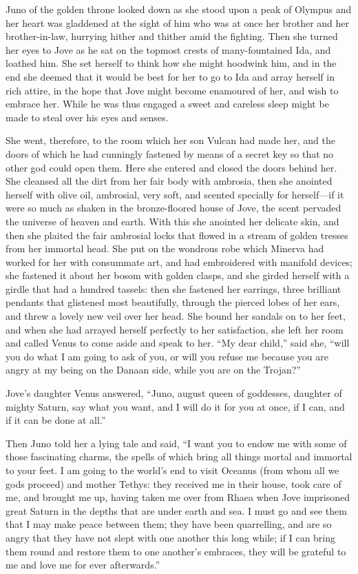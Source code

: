 Juno of the golden throne looked down as she stood upon a peak of Olympus
and her heart was gladdened at the sight of him who was at once her
brother and her brother-in-law, hurrying hither and thither amid the
fighting. Then she turned her eyes to Jove as he sat on the topmost crests
of many-fountained Ida, and loathed him. She set herself to think how she
might hoodwink him, and in the end she deemed that it would be best for
her to go to Ida and array herself in rich attire, in the hope that Jove
might become enamoured of her, and wish to embrace her. While he was thus
engaged a sweet and careless sleep might be made to steal over his eyes
and senses.

She went, therefore, to the room which her son Vulcan had made her, and
the doors of which he had cunningly fastened by means of a secret key so
that no other god could open them. Here she entered and closed the doors
behind her. She cleansed all the dirt from her fair body with ambrosia,
then she anointed herself with olive oil, ambrosial, very soft, and
scented specially for herself—if it were so much as shaken in the
bronze-floored house of Jove, the scent pervaded the universe of heaven
and earth. With this she anointed her delicate skin, and then she plaited
the fair ambrosial locks that flowed in a stream of golden tresses from
her immortal head. She put on the wondrous robe which Minerva had worked
for her with consummate art, and had embroidered with manifold devices;
she fastened it about her bosom with golden clasps, and she girded herself
with a girdle that had a hundred tassels: then she fastened her earrings,
three brilliant pendants that glistened most beautifully, through the
pierced lobes of her ears, and threw a lovely new veil over her head. She
bound her sandals on to her feet, and when she had arrayed herself
perfectly to her satisfaction, she left her room and called Venus to come
aside and speak to her. “My dear child,” said she, “will you do what I am
going to ask of you, or will you refuse me because you are angry at my
being on the Danaan side, while you are on the Trojan?”

Jove’s daughter Venus answered, “Juno, august queen of goddesses, daughter
of mighty Saturn, say what you want, and I will do it for you at once, if
I can, and if it can be done at all.”

Then Juno told her a lying tale and said, “I want you to endow me with
some of those fascinating charms, the spells of which bring all things
mortal and immortal to your feet. I am going to the world’s end to visit
Oceanus (from whom all we gods proceed) and mother Tethys: they received
me in their house, took care of me, and brought me up, having taken me
over from Rhaea when Jove imprisoned great Saturn in the depths that are
under earth and sea. I must go and see them that I may make peace between
them; they have been quarrelling, and are so angry that they have not
slept with one another this long while; if I can bring them round and
restore them to one another’s embraces, they will be grateful to me and
love me for ever afterwards.”

